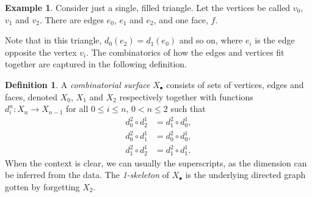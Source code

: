 \documentclass{tufte-handout}
\theoremstyle{definition}
\newtheorem{definition}{Definition}
\newtheorem{example}{Example}
\begin{document}
\begin{example}\label{eg:triangle_Delta_complex}
Consider
 just a single, filled triangle. Let the vertices be called $v_0$, $v_1$ and 
$v_2$. There are edges $e_0$, $e_1$ and $e_2$, and one face, $f$.
\end{example}

Note that in this triangle, $d_0(e_2)=d_1(e_0)$ and so on, where $e_i$ is the edge opposite 
the vertex $v_i$. The combinatorics of how the edges and vertices fit together are captured
in the following definition. 


\begin{definition}

A \emph{combinatorial surface} $X_\bullet$ consists of sets of vertices, 
edges and faces, denoted $X_0$, $X_1$ and $X_2$ respectively together with 
functions $d_i^n\colon X_n \to X_{n-1}$ for all $0\leq i \leq n$, $0<n\leq 2$ such 
that
\begin{align}\label{eq:simpl_ids_surf}
d_0^2\circ d_2^1 & = d_1^2\circ d_0^1, \nonumber\\
d_0^2\circ d_1^1 & = d_0^2\circ d_0^1,\\
d_1^2\circ d_2^1 & = d_1^2\circ d_1^1. \nonumber
\end{align}
When the context is clear, we can usually the superscripts, as the dimension can be inferred
from the data. The \emph{1-skeleton} of $X_\bullet$ is the underlying directed graph 
gotten by forgetting $X_2$.
\end{definition}
\end{document}

